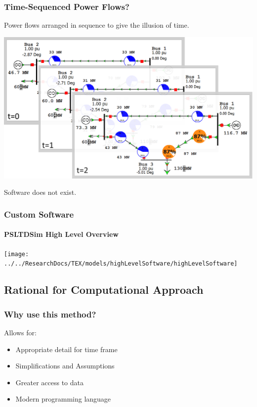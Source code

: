 \documentclass[14pt, unknownkeysallowed]{beamer}
\begin{document}
\begin{frame}
\frametitle{Time-Sequenced Power Flows?}
Power flows arranged in sequence to give the illusion of time.\\
\begin{center}
	\includegraphics[width=.6\linewidth]{powerFlowSequence}
\end{center}
Software does not exist.
\end{frame}
\begin{frame}
\frametitle{Custom Software}
\framesubtitle{PSLTDSim High Level Overview}
\begin{center}
	\texttt{[image: ../../ResearchDocs/TEX/models/highLevelSoftware/highLevelSoftware]}
\end{center}




\end{frame}
\subsection{Rational for Computational Approach}
\begin{frame}
\frametitle{Why use this method?}
Allows for:
\begin{itemize}
\item Appropriate detail for time frame
\item Simplifications and Assumptions
\item Greater access to data
\item Modern programming language
\end{itemize}
\end{frame}
\end{document}
